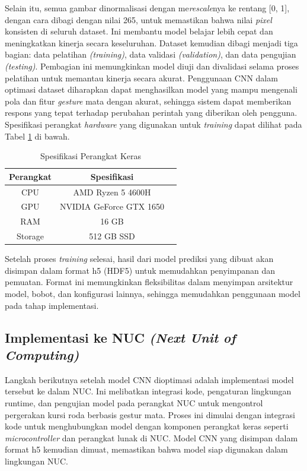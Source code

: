Selain itu, semua gambar dinormalisasi dengan me\emph{rescale}nya ke rentang [0, 1], dengan cara dibagi dengan nilai 265, untuk memastikan bahwa nilai \emph{pixel} konsisten di seluruh dataset. Ini membantu model belajar lebih cepat dan meningkatkan kinerja secara keseluruhan. Dataset kemudian dibagi menjadi tiga bagian: data pelatihan \emph{(training)}, data validasi \emph{(validation)}, dan data pengujian \emph{(testing)}. Pembagian ini memungkinkan model diuji dan divalidasi selama proses pelatihan untuk memantau kinerja secara akurat. Penggunaan CNN dalam optimasi dataset diharapkan dapat menghasilkan model yang mampu mengenali pola dan fitur \emph{gesture} mata dengan akurat, sehingga sistem dapat memberikan respons yang tepat terhadap perubahan perintah yang diberikan oleh pengguna. Spesifikasi perangkat \emph{hardware} yang digunakan untuk \emph{training} dapat dilihat pada Tabel \ref{tb:speklaptop} di bawah.

\begin{longtable}{|c|c|c|}
  \caption{Spesifikasi Perangkat Keras}
  \label{tb:speklaptop} \\
  \hline
  \rowcolor[HTML]{C0C0C0}
  \textbf{Perangkat}        & \textbf{Spesifikasi}    \\ \hline
  \multicolumn{1}{|c|}{CPU} & AMD Ryzen 5 4600H       \\ \hline
  \multicolumn{1}{|c|}{GPU} & NVIDIA GeForce GTX 1650 \\ \hline
  RAM                       & 16 GB                   \\ \hline
  Storage                   & 512 GB SSD              \\ \hline
\end{longtable}

Setelah proses \emph{training} selesai, hasil dari model prediksi yang dibuat akan disimpan dalam format h5 (HDF5) untuk memudahkan penyimpanan dan pemuatan. Format ini memungkinkan fleksibilitas dalam menyimpan arsitektur model, bobot, dan konfigurasi lainnya, sehingga memudahkan penggunaan model pada tahap implementasi.

\subsection{Implementasi ke NUC \textit{(Next Unit of Computing)}}

Langkah berikutnya setelah model CNN dioptimasi adalah implementasi model tersebut ke dalam NUC. Ini melibatkan integrasi kode, pengaturan lingkungan runtime, dan pengujian model pada perangkat NUC untuk mengontrol pergerakan kursi roda berbasis gestur mata. Proses ini dimulai dengan integrasi kode untuk menghubungkan model dengan komponen perangkat keras seperti \emph{microcontroller} dan perangkat lunak di NUC. Model CNN yang disimpan dalam format h5 kemudian dimuat, memastikan bahwa model siap digunakan dalam lingkungan NUC.

